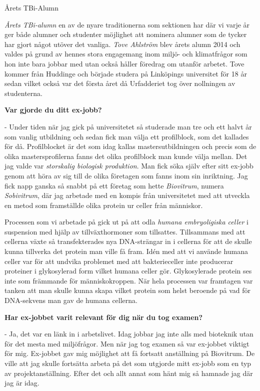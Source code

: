 \begin{news}{2}{Årets TBi-Alumn}{}{}{}{}


\emph{Årets TBi-alumn} en av de nyare traditionerna som sektionen har där vi varje 
år ger både alumner och studenter möjlighet att nominera alumner som de 
tycker har gjort något utöver det vanliga. \emph{Tove Ahlström} blev årets alumn 
2014 och valdes på grund av hennes stora engagemang inom miljö- och 
klimatfrågor som hon inte bara jobbar med utan också håller föredrag om 
utanför arbetet. Tove kommer från Huddinge och började studera på Linköpings 
universitet för 18 år sedan vilket också var det första året då Urfadderiet 
tog över nollningen av studenterna.
 
\textbf{Var gjorde du ditt ex-jobb?}
 
 - Under tiden när jag gick på universitetet så studerade man tre och ett halvt 
 år som vanlig utbildning och sedan fick man välja ett profilblock, som det 
kallades för då. Profilblocket är det som idag kallas mastersutbildningen och 
precis som de olika mastersprofilerna fanns det olika profilblock man kunde 
välja mellan. Det jag valde var \emph{storskalig biologisk produktion}. Man fick 
söka själv efter sitt ex-jobb genom att höra av sig till de olika företagen 
som fanns inom sin inriktning. Jag fick napp ganska så snabbt på ett företag 
som hette \emph{Biovitrum}, numera \emph{Sobivitrum}, där jag arbetade med en kompis från 
universitetet med att utveckla en metod som framställde olika protein ur 
celler från människor.

Processen som vi arbetade på gick ut på att odla \emph{humana embryoligiska celler} 
i suspension med hjälp av tillväxthormoner som tillsattes. Tillsammans med 
att cellerna växte så transfekterades nya DNA-strängar in i cellerna för att 
de skulle kunna tillverka det protein man ville få fram. Idén med att 
vi använde humana celler var för att undvika problemet med att bakterieceller 
inte producerar proteiner i glykosylerad form vilket humana celler gör. 
Glykosylerade protein ses inte som främmande för människokroppen. När hela 
processen var framtagen var tanken att man skulle kunna skapa vilket protein 
som helst beroende på vad för DNA-sekvens man gav de humana cellerna.
 
\textbf{Har ex-jobbet varit relevant för dig när du tog examen?}

 - Ja, det var en länk in i arbetslivet. Idag jobbar jag inte alls med bioteknik 
utan för det mesta med miljöfrågor. Men när jag tog examen så var ex-jobbet 
viktigt för mig. Ex-jobbet gav mig möjlighet att få fortsatt anställning på 
Biovitrum. De ville att jag skulle fortsätta arbeta på det som utgjorde mitt 
ex-jobb som en typ av projektanställning. Efter det och allt annat som hänt 
mig så hamnade jag där jag är idag. 



\end{news}
